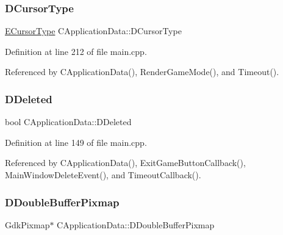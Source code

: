\hypertarget{classCApplicationData_a931cfbda23231fb441081f231326e7ee}{}\label{classCApplicationData_a931cfbda23231fb441081f231326e7ee} 
\subsubsection{\texorpdfstring{D\+Cursor\+Type}{DCursorType}}
{\footnotesize\ttfamily \hyperlink{classCApplicationData_ad024b66b60017c45c47a85dbc636ae69}{E\+Cursor\+Type} C\+Application\+Data\+::\+D\+Cursor\+Type\hspace{0.3cm}{\ttfamily [protected]}}



Definition at line 212 of file main.\+cpp.



Referenced by C\+Application\+Data(), Render\+Game\+Mode(), and Timeout().

\hypertarget{classCApplicationData_a0a8651f95f3d48befd6e02a286ecdc82}{}\label{classCApplicationData_a0a8651f95f3d48befd6e02a286ecdc82} 
\subsubsection{\texorpdfstring{D\+Deleted}{DDeleted}}
{\footnotesize\ttfamily bool C\+Application\+Data\+::\+D\+Deleted\hspace{0.3cm}{\ttfamily [protected]}}



Definition at line 149 of file main.\+cpp.



Referenced by C\+Application\+Data(), Exit\+Game\+Button\+Callback(), Main\+Window\+Delete\+Event(), and Timeout\+Callback().

\hypertarget{classCApplicationData_aefb64ec5ca3f791f6d431cfc56b9f3b3}{}\label{classCApplicationData_aefb64ec5ca3f791f6d431cfc56b9f3b3} 
\subsubsection{\texorpdfstring{D\+Double\+Buffer\+Pixmap}{DDoubleBufferPixmap}}
{\footnotesize\ttfamily Gdk\+Pixmap$\ast$ C\+Application\+Data\+::\+D\+Double\+Buffer\+Pixmap\hspace{0.3cm}{\ttfamily [protected]}}



